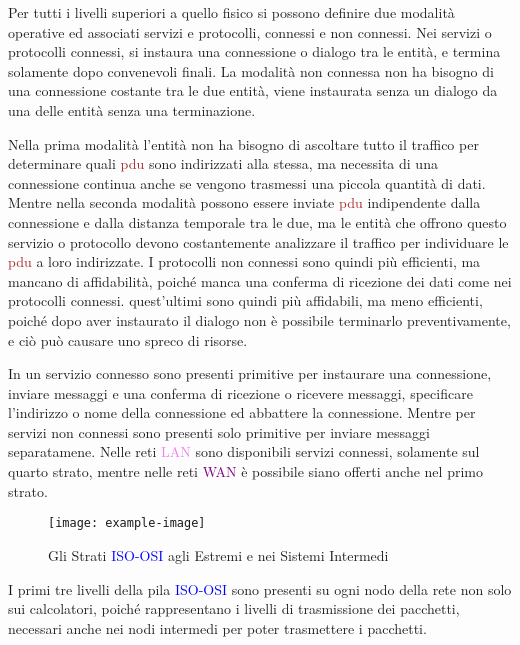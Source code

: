 \documentclass{article}
\numberwithin{equation}{subsection}
\begin{document}
Per tutti i livelli superiori a quello fisico si possono definire due modalità operative ed associati servizi e protocolli, connessi e non connessi. Nei servizi o 
protocolli connessi, si instaura una connessione o dialogo tra le entità, e termina solamente dopo convenevoli finali. La modalità non connessa non ha bisogno di una 
connessione costante tra le due entità, viene instaurata senza un dialogo da una delle entità senza una terminazione. 

Nella prima modalità l'entità non ha bisogno di ascoltare tutto il traffico per determinare quali \textcolor{Brown}{pdu} sono indirizzati alla stessa, ma necessita di una connessione 
continua anche se vengono trasmessi una piccola quantità di dati. Mentre nella seconda modalità possono essere inviate \textcolor{Brown}{pdu} indipendente dalla connessione e dalla 
distanza temporale tra le due, ma le entità che offrono questo servizio o protocollo devono costantemente analizzare il traffico per individuare le \textcolor{Brown}{pdu} a loro 
indirizzate. 
I protocolli non connessi sono quindi più efficienti, ma mancano di affidabilità, poiché manca una conferma di ricezione dei dati come nei protocolli connessi. quest'ultimi 
sono quindi più affidabili, ma meno efficienti, poiché dopo aver instaurato il dialogo non è possibile terminarlo preventivamente, e ciò può causare uno spreco di risorse. 


In un servizio connesso sono presenti primitive per instaurare una connessione, inviare messaggi e una conferma di ricezione o ricevere messaggi, specificare 
l'indirizzo o nome della connessione ed abbattere la connessione. Mentre per servizi non connessi sono presenti solo primitive per inviare messaggi separatamene. 
Nelle reti \textcolor{violet}{LAN} sono disponibili servizi connessi, solamente sul quarto strato, mentre nelle reti \textcolor{purple}{WAN} è possibile siano offerti anche nel primo strato.  

\begin{figure}[H]%
    \centering%
    \texttt{[image: example-image]}%
    \caption{Gli Strati \textcolor{blue}{ISO-OSI} agli Estremi e nei Sistemi Intermedi}%
\end{figure}

I primi tre livelli della pila \textcolor{blue}{ISO-OSI} sono presenti su ogni nodo della rete non solo sui calcolatori, poiché rappresentano i livelli di trasmissione dei pacchetti, 
necessari anche nei nodi intermedi per poter trasmettere i pacchetti. 
\end{document}
